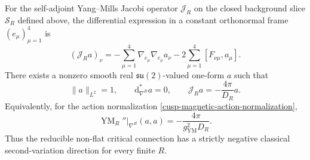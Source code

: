 \begin{theorem}
\label{cusp-magnetic-negative-mode}
For the self-adjoint Yang--Mills Jacobi operator \(\mathcal J_R\) on the
closed background slice \(\mathscr S_R\) defined above, the differential
expression in a constant orthonormal frame \((e_\mu)_{\mu=1}^4\) is
\begin{equation}
 (\mathcal J_Ra)_\nu
 =-\sum_{\mu=1}^4\nabla_{e_\mu}\nabla_{e_\mu}a_\nu
  -2\sum_{\mu=1}^4[F_{\nu\mu},a_\mu].
 \label{cusp-magnetic-jacobi-operator}
\end{equation}
There exists a nonzero smooth real
\(\mathfrak{su}(2)\)-valued one-form \(a\) such that
\begin{equation}
 \lVert a\rVert_{L^2}=1,
 \qquad
 \mathrm d_{\nabla^R}^*a=0,
 \qquad
 \mathcal J_Ra=-\frac{4\pi}{D_R}a.
 \label{cusp-magnetic-negative-eigen-equation}
\end{equation}
Equivalently, for the action normalization
\cref{cusp-magnetic-action-normalization},
\begin{equation}
 \operatorname{YM}_R''\big|_{\nabla^R}(a,a)
 =-\frac{4\pi}{g_{\mathrm{YM}}^2D_R}.
 \label{cusp-magnetic-negative-hessian}
\end{equation}
Thus the reducible non-flat critical connection has a strictly negative
classical second-variation direction for every finite \(R\).
\end{theorem}

